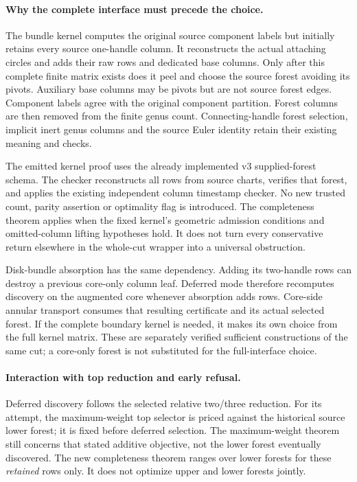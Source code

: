 \paragraph{Why the complete interface must precede the choice.}
The bundle kernel computes the original source component labels but
initially retains every source one-handle column. It reconstructs the
actual attaching circles and adds their raw rows and dedicated base
columns. Only after this complete finite matrix exists does it peel and
choose the source forest avoiding its pivots. Auxiliary base columns may
be pivots but are not source forest edges. Component labels agree with
the original component partition. Forest columns are then removed from
the finite genus count. Connecting-handle forest selection, implicit
inert genus columns and the source Euler identity retain their existing
meaning and checks.

The emitted kernel proof uses the already implemented v3 supplied-forest
schema. The checker reconstructs all rows from source charts, verifies
that forest, and applies the existing independent column timestamp
checker. No new trusted count, parity assertion or optimality flag is
introduced. The completeness theorem applies when the fixed kernel's
geometric admission conditions and omitted-column lifting hypotheses
hold. It does not turn every conservative return elsewhere in the
whole-cut wrapper into a universal obstruction.

Disk-bundle absorption has the same dependency. Adding its two-handle
rows can destroy a previous core-only column leaf. Deferred mode therefore
recomputes discovery on the augmented core whenever absorption adds rows.
Core-side annular transport consumes that resulting certificate and its
actual selected forest. If the complete boundary kernel is needed, it
makes its own choice from the full kernel matrix. These are separately
verified sufficient constructions of the same cut; a core-only forest is
not substituted for the full-interface choice.

\paragraph{Interaction with top reduction and early refusal.}
Deferred discovery follows the selected relative two/three reduction.
For its attempt, the maximum-weight top selector is priced against the
historical source lower forest; it is fixed before deferred selection.
The maximum-weight theorem still concerns that stated additive objective,
not the lower forest eventually discovered. The new completeness theorem
ranges over lower forests for these \emph{retained} rows only. It does not
optimize upper and lower forests jointly.

